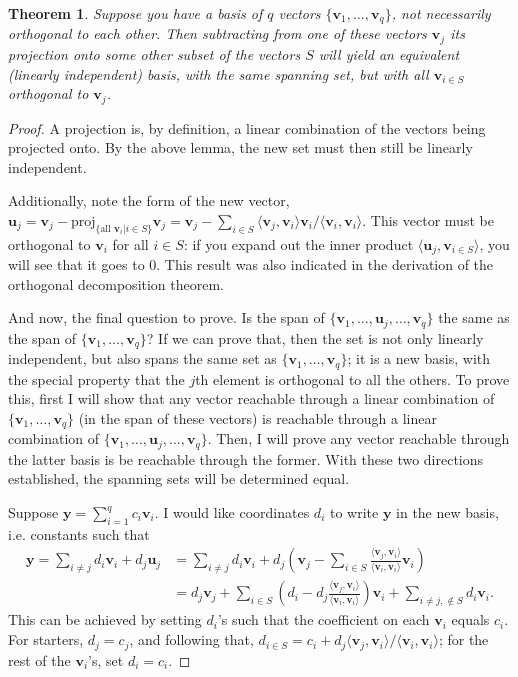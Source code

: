 \documentclass[draft,12pt]{report}
\newtheorem{theorem}{Theorem}
\renewcommand{\vec}[1]{\mathbf{#1}}
\begin{document}
\begin{theorem}
    Suppose you have a basis of $q$ vectors $\{ \vec{v}_1, \ldots, \vec{v}_q \}$, not necessarily orthogonal to each other. Then subtracting from one of these vectors $\vec{v}_j$ its projection onto some other subset of the vectors $S$ will yield an equivalent (linearly independent) basis, with the same spanning set, but with all $\vec{v}_{i \in S}$ orthogonal to $\vec{v}_j$.
\end{theorem}
\begin{proof}
    A projection is, by definition, a linear combination of the vectors being projected onto. By the above lemma, the new set must then still be linearly independent.
    
    Additionally, note the form of the new vector, $\vec{u}_j = \vec{v}_j - \mathrm{proj}_{\{\text{all } \vec{v}_i | i \in S \}} \vec{v}_j = \vec{v}_j - \sum_{i \in S} \langle \vec{v}_j, \vec{v}_i \rangle \vec{v}_i / \langle \vec{v}_i, \vec{v}_i \rangle$. This vector must be orthogonal to $\vec{v}_i$ for all $i \in S$: if you expand out the inner product $\langle \vec{u}_j, \vec{v}_{i \in S} \rangle$, you will see that it goes to 0. This result was also indicated in the derivation of the orthogonal decomposition theorem.
    
    And now, the final question to prove. Is the span of $\{ \vec{v}_1, \ldots, \vec{u}_j, \ldots, \vec{v}_q \}$ the same as the span of $\{ \vec{v}_1, \ldots, \vec{v}_q \}$? If we can prove that, then the set is not only linearly independent, but also spans the same set as $\{ \vec{v}_1, \ldots, \vec{v}_q \}$; it is a new basis, with the special property that the $j$th element is orthogonal to all the others. To prove this, first I will show that any vector reachable through a linear combination of $\{ \vec{v}_1, \ldots, \vec{v}_q \}$ (in the span of these vectors) is reachable through a linear combination of $\{ \vec{v}_1, \ldots, \vec{u}_j, \ldots, \vec{v}_q \}$. Then, I will prove any vector reachable through the latter basis is be reachable through the former. With these two directions established, the spanning sets will be determined equal.
    
    Suppose $\vec{y} = \sum_{i = 1}^q c_i \vec{v}_i$. I would like coordinates $d_i$ to write $\vec{y}$ in the new basis, i.e. constants such that
    \begin{align*}
        \vec{y} = \sum_{i \neq j} d_i \vec{v}_i + d_j \vec{u}_j &= \sum_{i \neq j} d_i \vec{v}_i + d_j \left( \vec{v}_j - \sum_{i \in S} \frac{\langle \vec{v}_j, \vec{v}_i \rangle}{\langle \vec{v}_i, \vec{v}_i \rangle} \vec{v}_i \right) \\
        &= d_j \vec{v}_j + \sum_{i \in S} \left( d_i - d_j \frac{\langle \vec{v}_j, \vec{v}_i \rangle}{\langle \vec{v}_i, \vec{v}_i \rangle} \right) \vec{v}_i + \sum_{i \neq j, \notin S} d_i \vec{v}_i.
    \end{align*}
    This can be achieved by setting $d_i$'s such that the coefficient on each $\vec{v}_i$ equals $c_i$. For starters, $d_j = c_j$, and following that, $d_{i \in S} = c_i + d_j \langle \vec{v}_j, \vec{v}_i \rangle / \langle \vec{v}_i, \vec{v}_i \rangle$; for the rest of the $\vec{v}_i$'s, set $d_i = c_i$.
    

\end{proof}
\end{document}

